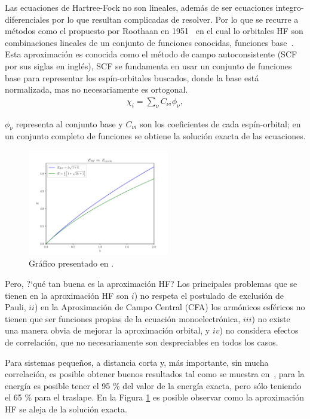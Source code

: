 Las ecuaciones de Hartree-Fock no son lineales, además de ser ecuaciones
integro-di\-fe\-ren\-cia\-les por lo que resultan complicadas de resolver. Por
lo que se recurre a métodos como el propuesto por Roothaan en
1951~\cite{Roothaan1951} en el cual lo orbitales HF son combinaciones lineales
de un conjunto de funciones conocidas, funciones base~\cite{levine}. Esta
aproximación es conocida como el método de campo autoconsistente (SCF por sus
siglas en inglés), SCF se fundamenta en usar un conjunto de funciones base para
representar los espín-orbitales buscados, donde la base está normalizada, mas
no necesariamente es ortogonal.
%
\begin{align}
  \chi_{i} = \sum_{\nu} C_{\nu i}\phi_{\nu},
\end{align}

\noindent ${\phi_{\nu}}$ representa al conjunto base y $C_{\nu i}$
son los coeficientes de cada espín-orbital; en un conjunto completo de funciones se
obtiene la solución exacta de las ecuaciones.

\begin{figure}
    \centering
    \includegraphics[width=0.55\textwidth]{3/img/HF_vs_excat}
    \caption{Gráfico presentado en .}
\label{HF_vs_excat}
\end{figure}
%
Pero, ?`qué tan buena es la aproximación HF?  Los principales problemas que se
tienen en la aproximación HF son $i$) no respeta el postulado de exclusión de
Pauli, $ii$) en la Aproximación de Campo Central (CFA) los armónicos esféricos
no tienen que ser funciones propias de la ecuación monoelectrónica, $iii$) no
existe una manera obvia de mejorar la aproximación orbital, y $iv$) no
considera efectos de correlación, que no necesariamente son despreciables en
todos los casos.

Para sistemas pequeños, a distancia corta y, más importante, sin mucha
correlación, es posible obtener buenos resultados tal como se muestra
en~, para la energía es posible tener el 95 \% del valor de
la energía exacta, pero sólo teniendo el 65 \% para el traslape. En la Figura
\ref{HF_vs_excat} es posible observar como la aproximación HF se aleja de la
solución exacta.

